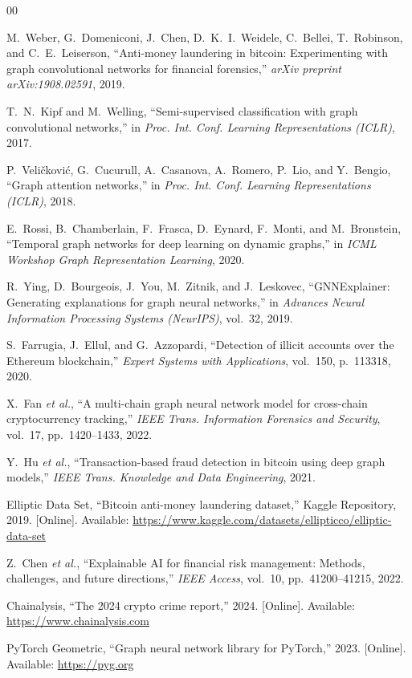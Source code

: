 \documentclass[conference]{IEEEtran}
\begin{document}
\begin{thebibliography}{00}

M.~Weber, G.~Domeniconi, J.~Chen, D.~K.~I.~Weidele, C.~Bellei, T.~Robinson, and C.~E.~Leiserson, ``Anti-money laundering in bitcoin: Experimenting with graph convolutional networks for financial forensics,'' \textit{arXiv preprint arXiv:1908.02591}, 2019.

T.~N.~Kipf and M.~Welling, ``Semi-supervised classification with graph convolutional networks,'' in \textit{Proc. Int. Conf. Learning Representations (ICLR)}, 2017.

P.~Veli\v{c}kovi\'{c}, G.~Cucurull, A.~Casanova, A.~Romero, P.~Lio, and Y.~Bengio, ``Graph attention networks,'' in \textit{Proc. Int. Conf. Learning Representations (ICLR)}, 2018.

E.~Rossi, B.~Chamberlain, F.~Frasca, D.~Eynard, F.~Monti, and M.~Bronstein, ``Temporal graph networks for deep learning on dynamic graphs,'' in \textit{ICML Workshop Graph Representation Learning}, 2020.

R.~Ying, D.~Bourgeois, J.~You, M.~Zitnik, and J.~Leskovec, ``GNNExplainer: Generating explanations for graph neural networks,'' in \textit{Advances Neural Information Processing Systems (NeurIPS)}, vol.~32, 2019.

S.~Farrugia, J.~Ellul, and G.~Azzopardi, ``Detection of illicit accounts over the Ethereum blockchain,'' \textit{Expert Systems with Applications}, vol.~150, p.~113318, 2020.

X.~Fan \textit{et al.}, ``A multi-chain graph neural network model for cross-chain cryptocurrency tracking,'' \textit{IEEE Trans. Information Forensics and Security}, vol.~17, pp.~1420--1433, 2022.

Y.~Hu \textit{et al.}, ``Transaction-based fraud detection in bitcoin using deep graph models,'' \textit{IEEE Trans. Knowledge and Data Engineering}, 2021.

Elliptic Data Set, ``Bitcoin anti-money laundering dataset,'' Kaggle Repository, 2019. [Online]. Available: \url{https://www.kaggle.com/datasets/ellipticco/elliptic-data-set}

Z.~Chen \textit{et al.}, ``Explainable AI for financial risk management: Methods, challenges, and future directions,'' \textit{IEEE Access}, vol.~10, pp.~41200--41215, 2022.

Chainalysis, ``The 2024 crypto crime report,'' 2024. [Online]. Available: \url{https://www.chainalysis.com}

PyTorch Geometric, ``Graph neural network library for PyTorch,'' 2023. [Online]. Available: \url{https://pyg.org}

\end{thebibliography}
\end{document}
